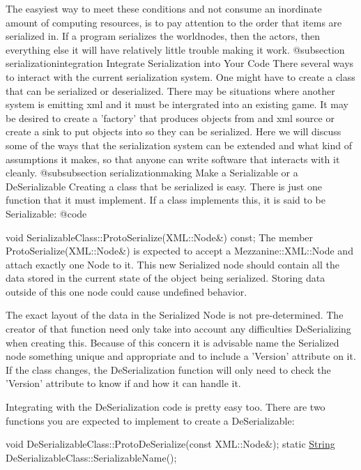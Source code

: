 \begin{DoxyVerb}
   The easyiest way to meet these conditions and not consume an inordinate amount of computing resources, is to pay attention
   to the order that items are serialized in. If a program serializes the worldnodes, then the actors, then everything  else
   it will have relatively little trouble making it work.
   @subsection serializationintegration Integrate Serialization into Your Code
   There several ways to interact with the current serialization system. One might have to create a class that can be
   serialized or deserialized. There may be situations where another system is emitting xml and it must be intergrated into
   an existing game. It may be desired to create a 'factory' that produces objects from and xml source or create a sink to put
   objects into so they can be serialized. Here we will discuss some of the ways that the serialization system can be extended
   and what kind of assumptions it makes, so that anyone can write software that interacts with it cleanly.
   @subsubsection serializationmaking Make a Serializable or a DeSerializable
   Creating a class that be serialized is easy. There is just one function that it must implement. If a class implements this,
   it is said to be Serializable:
   @code 
\end{DoxyVerb}
 void Serializable\-Class\-::\-Proto\-Serialize(\-X\-M\-L\-::\-Node\&) const;  The member Proto\-Serialize(\-X\-M\-L\-::\-Node\&) is expected to accept a Mezzanine\-::\-X\-M\-L\-::\-Node and attach exactly one Node to it. This new Serialized node should contain all the data stored in the current state of the object being serialized. Storing data outside of this one node could cause undefined behavior. \par
 \par
 The exact layout of the data in the Serialized Node is not pre-\/determined. The creator of that function need only take into account any difficulties De\-Serializing when creating this. Because of this concern it is advisable name the Serialized node something unique and appropriate and to include a 'Version' attribute on it. If the class changes, the De\-Serialization function will only need to check the 'Version' attribute to know if and how it can handle it. \par
 \par
 Integrating with the De\-Serialization code is pretty easy too. There are two functions you are expected to implement to create a De\-Serializable\-: 
\begin{DoxyCode}
\textcolor{keywordtype}{void} DeSerializableClass::ProtoDeSerialize(\textcolor{keyword}{const} XML::Node&);
\textcolor{keyword}{static} \hyperlink{namespaceMezzanine_acf9fcc130e6ebf08e3d8491aebcf1c86}{String} DeSerializableClass::SerializableName();
\end{DoxyCode}
